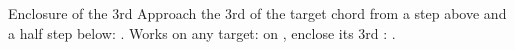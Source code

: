 \begin{patternbox}{Enclosure of the 3rd}{}
Approach the 3rd of the target chord from a step above and a half step below:
. Works on any target: on , enclose its 3rd : .
\patternwhereline
\end{patternbox}
